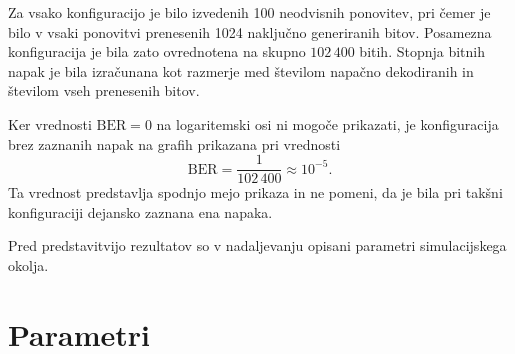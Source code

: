 \documentclass[a4paper, 12pt, openany]{book}
\begin{document}
Za vsako konfiguracijo je bilo izvedenih 100 neodvisnih ponovitev, pri čemer je bilo v vsaki ponovitvi prenesenih 1024 naključno generiranih bitov. Posamezna konfiguracija je bila zato ovrednotena na skupno $102\,400$ bitih. Stopnja bitnih napak je bila izračunana kot razmerje med številom napačno dekodiranih in številom vseh prenesenih bitov.

Ker vrednosti $\mathrm{BER}=0$ na logaritemski osi ni mogoče prikazati, je konfiguracija brez zaznanih napak na grafih prikazana pri vrednosti
\[
\mathrm{BER}=\frac{1}{102\,400}\approx10^{-5}.
\]
Ta vrednost predstavlja spodnjo mejo prikaza in ne pomeni, da je bila pri takšni konfiguraciji dejansko zaznana ena napaka.

Pred predstavitvijo rezultatov so v nadaljevanju opisani parametri simulacijskega okolja.

\clearpage
\enlargethispage{6\baselineskip}
\section{Parametri}
\end{document}
